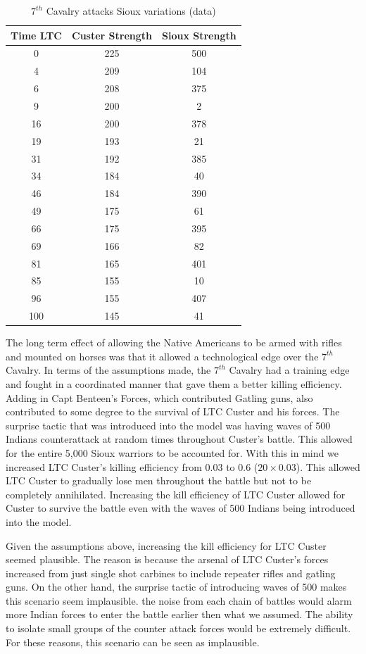 \documentclass[letterpaper,10pt]{article}
\begin{document}
\begin{table}
\begin{center}
\begin{tabular}[h!tp]{ccc}
\hline
\textbf{Time	LTC} & \textbf{Custer Strength} & \textbf{Sioux Strength} \\
\hline\hline
0	& 225 &	500 \\
4	& 209 &	104 \\
6	& 208 &	375 \\
9	& 200 &	2 \\
16	& 200 &	378 \\
19	& 193 &	21 \\
31	& 192 &	385 \\
34	& 184 &	40 \\
46	& 184 &	390 \\
49	& 175 &	61 \\
66	& 175 &	395 \\
69	& 166 &	82 \\
81	& 165 &	401 \\
85	& 155 &	10 \\
96	& 155 &	407 \\
100	& 145 &	41 \\
\hline
\end{tabular}
\end{center}
\caption{$7^{th}$ Cavalry attacks Sioux variations (data)}
\label{tab7a}
\end{table}

The long term effect of allowing the Native Americans to be armed with rifles and mounted on horses was that it allowed a technological edge over the $7^{th}$ Cavalry. In terms of the assumptions made, the $7^{th}$ Cavalry had a training edge and fought in a coordinated manner that gave them a better killing efficiency.  Adding in Capt Benteen’s Forces, which contributed Gatling guns, also contributed to some degree to the survival of LTC Custer and his forces. The surprise tactic that was introduced into the model was having waves of 500 Indians counterattack at random times throughout Custer’s battle. This allowed for the entire 5,000 Sioux warriors to be accounted for.   With this in mind we increased LTC Custer’s killing efficiency from 0.03 to 0.6 ($20\times 0.03$). This allowed LTC Custer to gradually lose men throughout the battle but not to be completely annihilated.  Increasing the kill efficiency of LTC Custer allowed for Custer to survive the battle even with the waves of 500 Indians being introduced into the model.   

Given the assumptions above, increasing the kill efficiency for LTC Custer seemed plausible. The reason is because the arsenal of LTC Custer's forces increased from just single shot carbines to  include repeater rifles and gatling guns. On the other hand, the surprise tactic of introducing waves of 500 makes this scenario seem implausible. the noise from each chain of battles would alarm more Indian forces to enter the battle earlier then what we assumed. The ability to isolate small groups of the counter attack forces would be extremely difficult. For these reasons, this scenario can be seen as implausible.  
\end{document}

